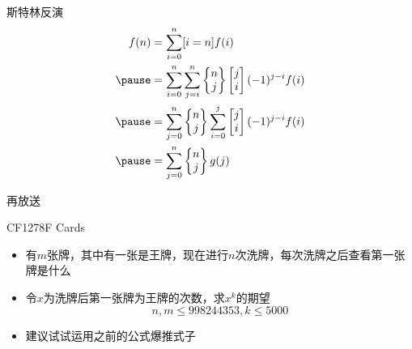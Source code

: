 \documentclass{beamer}
\begin{document}
\begin{frame}{斯特林反演}
    $$\begin{aligned}
        f(n) &= \sum_{i = 0}^n [i = n]f(i)\\ \pause
        &= \sum_{i = 0}^n\sum_{j = i}^n\begin{Bmatrix}n\\ j\end{Bmatrix}\begin{bmatrix}j\\ i\end{bmatrix}(-1)^{j - i}f(i)\\ \pause
        &= \sum_{j = 0}^n\begin{Bmatrix}n\\ j\end{Bmatrix}\sum_{i = 0}^j\begin{bmatrix}j\\ i\end{bmatrix}(-1)^{j - i}f(i)\\ \pause
        &= \sum_{j = 0}^n\begin{Bmatrix}n\\ j\end{Bmatrix}g(j)
    \end{aligned}$$
\end{frame}

\begin{frame}{再放送}
    \begin{block}{CF1278F Cards}
        \begin{itemize}
            \item 有$m$张牌，其中有一张是王牌，现在进行$n$次洗牌，每次洗牌之后查看第一张牌是什么
            \item 令$x$为洗牌后第一张牌为王牌的次数，求$x^k$的期望
            $$n,m\leq 998244353,k\leq 5000$$
        \end{itemize}
    \end{block}
    \begin{itemize}
        \item 建议试试运用之前的公式爆推式子
    \end{itemize}
\end{frame}
\end{document}

